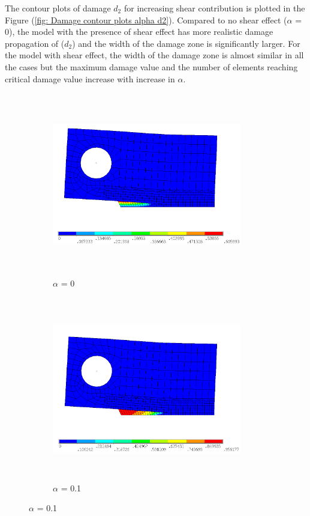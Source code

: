 \documentclass[a4paper,12pt,twoside]{report}
\begin{document}
\indent\indent\indent The contour plots of damage $d_{2}$ for increasing shear contribution is plotted in the Figure (\ref{fig: Damage contour plots alpha d2}). Compared to no shear effect ($\alpha$ = 0), the model with the presence of shear effect has more realistic damage propagation of ($d_{2}$) and the width of the damage zone is significantly larger. For the model with shear effect, the width of the damage zone is almost similar in all the cases but the maximum damage value and the number of elements reaching critical damage value increase with increase in $\alpha$. 
\begin{figure}[htbp!]
       \captionsetup[subfigure]{justification=centering}
     \begin{subfigure}{0.4\textwidth}
        \centering
         \includegraphics[width=8.3cm,height=8cm,keepaspectratio]{26.d2-1.png}
         \centering
         \caption{$\alpha$ = 0}
         \label{fig:d2-a_0}
     \end{subfigure}
     \hspace{1.8cm}
     \captionsetup[subfigure]{justification=centering}
     \begin{subfigure}{0.4\textwidth}
         \centering
         \includegraphics[width=8.3cm,height=8cm,keepaspectratio]{26.d2_a_0.1.png}
         \centering
         \caption{$\alpha$ = 0.1}
         \label{fig:d2-a_0.1}
     \end{subfigure}
\end{figure}
\end{document}
